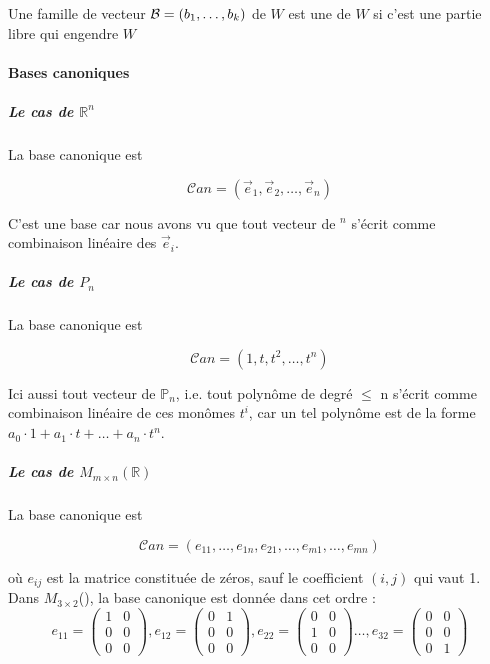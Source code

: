 \begin{definition}
    Une famille  de vecteur $\mathcal{B} = (b_1, \dots, b_k)$ de $W$ est une  de $W$ si c'est une partie libre qui engendre $W$ 
\end{definition}

\paragraph{Bases canoniques}

\subparagraph{Le cas de $\mathbb{R}^n$}
La base canonique est 
\begin{formule}

\[
\mathcal{C}an = (\vec{e}_1, \vec{e}_2, \ldots, \vec{e}_n)
\]
\end{formule}
C'est une base car nous avons vu que tout vecteur de \R$^n$ s'écrit comme combinaison linéaire des $\vec{e}_i$.
\\
\subparagraph{Le cas de $P_n$}
La base canonique est 
\begin{formule}
    

\[
\mathcal{C}an = (1, t, t^2, \ldots, t^n)
\]
\end{formule}
Ici aussi tout vecteur de $\mathbb{P}_n$, i.e. tout polynôme de degré $\leq$ n s'écrit comme combinaison linéaire de ces monômes $t^i$, car un tel polynôme est de la forme $a_0\cdot 1 + a_1\cdot t + \dots + a_n\cdot t^n$.
\subparagraph{Le cas de $M_{m \times n}(\mathbb{R})$}
La base canonique est 
\begin{formule}
\[
\mathcal{C}an = (e_{11}, \ldots, e_{1n}, e_{21}, \ldots, e_{m1}, \ldots, e_{mn})
\]
\end{formule}
où $e_{ij}$ est la matrice constituée de zéros, sauf le coefficient $(i, j)$ qui vaut 1. Dans $M_{3\times 2}$(\R), la base canonique est donnée dans cet ordre :
\\
\[e_{11} = \begin{pmatrix}
    1 & 0\\
    0 & 0 \\
    0 & 0
\end{pmatrix}, e_{12} = \begin{pmatrix}
    0 & 1 \\ 0 & 0 \\ 0 & 0
\end{pmatrix}, e_{22} = \begin{pmatrix}
    0 & 0 \\ 1 & 0 \\ 0 & 0
\end{pmatrix} \dots, e_{32} = \begin{pmatrix}
    0 & 0 \\ 0 & 0 \\ 0 & 1
\end{pmatrix} \]


